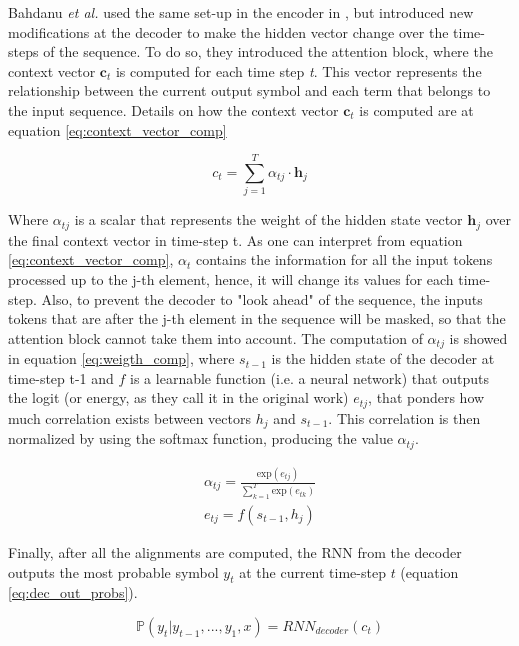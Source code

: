 Bahdanu \textit{et al.} used the same set-up in the encoder in \cite{bahdanau2016neural}, but introduced new modifications at the decoder to make the hidden vector change over the time-steps of the sequence. To do so, they introduced the attention block, where the context vector $\textbf{c}_t$ is computed for each time step \textit{t}. This vector represents the relationship between the current output symbol and each term that belongs to the input sequence. Details on how the context vector $\textbf{c}_t$ is computed are at equation \ref{eq:context_vector_comp}

\begin{equation}
	\label{eq:context_vector_comp}
	c_t = \sum_{j=1}^{T} \alpha_{tj} \cdot \textbf{h}_j
\end{equation}

Where $\alpha_{tj}$ is a scalar that represents the weight of the hidden state vector $ \textbf{h}_j$ over the final context vector in time-step t. As one can interpret from equation \ref{eq:context_vector_comp},  $\alpha_{t}$ contains the information for all the input tokens processed up to the j-th element, hence, it will change its values for each time-step. Also, to prevent the decoder to "look ahead" of the sequence, the inputs tokens that are after the  j-th element in the sequence will be masked, so that the attention block cannot take them into account. The computation of  $\alpha_{tj}$ is showed in equation \ref{eq:weigth_comp}, where $s_{t-1}$ is the hidden state of the decoder at time-step t-1 and $f$ is a learnable function (i.e. a neural network) that outputs the logit (or energy, as they call it in the original work) $e_{tj}$, that ponders how much correlation exists between vectors $h_j$ and $s_{t-1}$. This correlation is then normalized by using the softmax function, producing the value $\alpha_{tj}$.

\begin{equation}
	\label{eq:weigth_comp}
	\begin{split}
		\alpha_{tj} = \frac{\text{exp}(e_{tj})}{\sum_{k=1}^{T} \text{exp}(e_{tk})} \\
		e_{tj} = f(s_{t-1}, h_j)
	\end{split}
\end{equation}

Finally, after all the alignments are computed, the RNN from the decoder outputs the most probable symbol $y_t$ at the current time-step $t$ (equation \ref{eq:dec_out_probs}).

\begin{equation}
	\label{eq:dec_out_probs}
	\mathbb{P}(y_t | y_{t-1}, ..., y_1, x) = RNN_{decoder} (c_t)
\end{equation}

